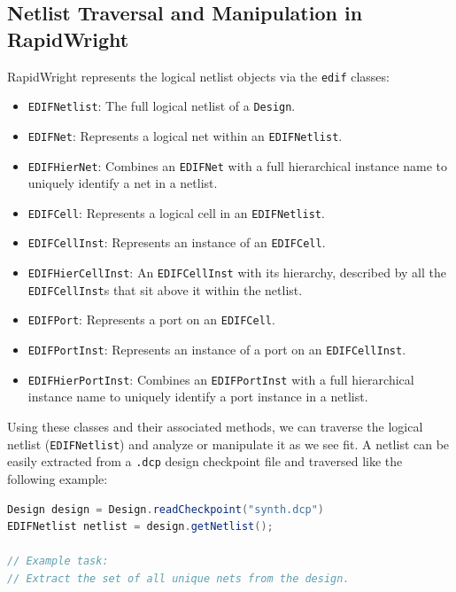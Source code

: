 \begin{multicols}{2}

\subsection{Netlist Traversal and Manipulation in RapidWright}

RapidWright represents the logical netlist objects via the \texttt{edif} classes:
\begin{itemize}
    \item \texttt{EDIFNetlist}: The full logical netlist of a \texttt{Design}. 
    \item \texttt{EDIFNet}: Represents a logical net within an \texttt{EDIFNetlist}.
    \item \texttt{EDIFHierNet}: Combines an \texttt{EDIFNet} with a full hierarchical instance name to uniquely identify a net in a netlist.
    \item \texttt{EDIFCell}: Represents a logical cell in an \texttt{EDIFNetlist}. 
    \item \texttt{EDIFCellInst}: Represents an instance of an \texttt{EDIFCell}. 
    \item \texttt{EDIFHierCellInst}: An \texttt{EDIFCellInst} with its hierarchy, described by all the \texttt{EDIFCellInst}s that sit above it within the netlist.
    \item \texttt{EDIFPort}: Represents a port on an \texttt{EDIFCell}. 
    \item \texttt{EDIFPortInst}: Represents an instance of a port on an \texttt{EDIFCellInst}. 
    \item \texttt{EDIFHierPortInst}: Combines an \texttt{EDIFPortInst} with a full hierarchical instance name to uniquely identify a port instance in a netlist. 
\end{itemize}


Using these classes and their associated methods, we can traverse the logical netlist (\texttt{EDIFNetlist}) and analyze or manipulate it as we see fit. 
A netlist can be easily extracted from a \texttt{.dcp} design checkpoint file and traversed like the following example:

\begin{lstlisting}[language=java, caption={Netlist extraction and traversal}, label={lst:netlist_extract}]
Design design = Design.readCheckpoint("synth.dcp")
EDIFNetlist netlist = design.getNetlist();

// Example task:
// Extract the set of all unique nets from the design.


\end{lstlisting}
\end{multicols}
